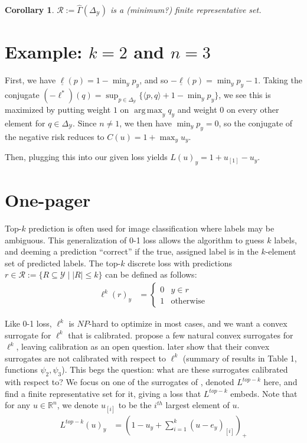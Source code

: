 \documentclass[12pt]{article}
\newcommand{\reals}{\mathbb{R}}
\newcommand{\simplex}{\Delta_\Y}
\newcommand{\R}{\mathcal{R}}
\newcommand{\Y}{\mathcal{Y}}
\newcommand{\risk}[1]{\underline{#1}}
\newcommand{\inprod}[2]{\langle #1, #2 \rangle}%
\DeclareMathOperator*{\argmax}{arg\,max}
\newtheorem{corollary}{Corollary}
\begin{document}
\begin{corollary}
	$\R := \hat \Gamma(\simplex)$ is a (minimum?) finite representative set.
\end{corollary}





\section{Example: $k=2$ and $n=3$}
First, we have $\risk{\ell}(p) = 1 - \min_y p_y$, and so $-\risk{\ell}(p) = \min_y p_y - 1$.
Taking the conjugate $(-\ell^*)(q) = \sup_{p \in \simplex} \{\inprod p q + 1 - \min_y p_y\}$, we see this is maximized by putting weight $1$ on $\argmax_y q_y$ and weight $0$ on every other element for $q \in \simplex$.
Since $n \neq 1$, we then have $\min_y p_y = 0$, so the conjugate of the negative risk reduces to $C(u) = 1 + \max_y u_y$.

Then, plugging this into our given loss yields $L(u)_y = 1 + u_{[1]} - u_y$.


\section{One-pager}
Top-$k$ prediction is often used for image classification where labels may be ambiguous.
This generalization of 0-1 loss allows the algorithm to guess $k$ labels, and deeming a prediction ``correct'' if the true, assigned label is in the $k$-element set of predicted labels.
The top-$k$ discrete loss with predictions $r \in \R := \{R \subseteq \Y \mid |R| \leq k\}$ can be defined as follows:
\begin{align*}
\ell^k(r)_y &=
\begin{cases}
0 & y \in r \\
1 & \text{otherwise}
\end{cases}
\end{align*}

Like 0-1 loss, $\ell^k$ is $NP$-hard to optimize in most cases, and we want a convex surrogate for $\ell^k$ that is calibrated.
\citet{lapin2015top, lapin2015loss} propose a few natural convex surrogates for $\ell^k$, leaving calibration as an open question.
\citet{yang2020consistency} later show that their convex surrogates are not calibrated with respect to $\ell^k$ (summary of results in Table 1, functions $\psi_2, \psi_3$).
This begs the question: what are these surrogates calibrated with respect to?
We focus on one of the surrogates of \citet{lapin2015top,lapin2015loss}, denoted $L^{top-k}$ here, and find a finite representative set for it, giving a loss that $L^{top-k}$ embeds.
Note that for any $u \in \reals^n$, we denote $u_{[i]}$ to be the $i^{th}$ largest element of $u$.
\begin{align*}
L^{top-k}(u)_y &= \left(1 - u_y + \sum_{i=1}^k(u-e_y)_{[i]}\right)_+
\end{align*}
\end{document}

